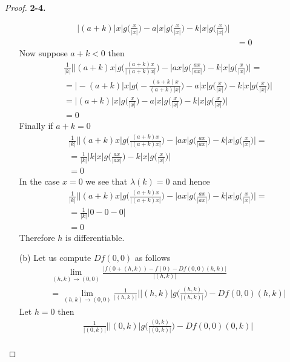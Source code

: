 \documentclass[11pt]{article}
\theoremstyle{definition}
\begin{document}
\begin{proof}{\textbf{2-4.}}
\begin{itemize}
\begin{align*}
    \bigg|(a + k)|x|g\bigg(\frac{x}{|x|}\bigg)
    - a|x|g\bigg(\frac{x}{|x|}\bigg)
    - k|x|g\bigg(\frac{x}{|x|}\bigg)
    \bigg|\\
    &= 0
\end{align*}
Now suppose $a + k < 0$ then
\begin{align*}
    &\frac{1}{|k|}
    \bigg||(a + k)x|g\bigg(\frac{(a + k)x}{|(a + k)x|}\bigg)
    - |ax|g\bigg(\frac{ax}{|ax|}\bigg)
    - k|x|g\bigg(\frac{x}{|x|}\bigg)
    \bigg| = \\
    &= \bigg|-(a + k)|x|g\bigg(-\frac{(a + k)x}{(a + k)|x|}\bigg)
    - a|x|g\bigg(\frac{x}{|x|}\bigg)
    - k|x|g\bigg(\frac{x}{|x|}\bigg)
    \bigg|\\
    &= \bigg|(a + k)|x|g\bigg(\frac{x}{|x|}\bigg)
    - a|x|g\bigg(\frac{x}{|x|}\bigg)
    - k|x|g\bigg(\frac{x}{|x|}\bigg)
    \bigg|\\
    &= 0
\end{align*}
Finally if $a + k = 0$
\begin{align*}
    &\frac{1}{|k|}
    \bigg||(a + k)x|g\bigg(\frac{(a + k)x}{|(a + k)x|}\bigg)
    - |ax|g\bigg(\frac{ax}{|ax|}\bigg)
    - k|x|g\bigg(\frac{x}{|x|}\bigg)
    \bigg| = \\
    &=\frac{1}{|k|}
    \bigg| k|x|g\bigg(\frac{ax}{|ax|}\bigg)
    - k|x|g\bigg(\frac{x}{|x|}\bigg)
    \bigg|\\
    &= 0
\end{align*}
In the case $x = 0$ we see that $\lambda(k) = 0$ and hence
\begin{align*}
    &\frac{1}{|k|}
    \bigg||(a + k)x|g\bigg(\frac{(a + k)x}{|(a + k)x|}\bigg)
    - |ax|g\bigg(\frac{ax}{|ax|}\bigg)
    - k|x|g\bigg(\frac{x}{|x|}\bigg)
    \bigg| = \\
    &=\frac{1}{|k|} \bigg| 0 - 0 - 0 \bigg|\\
    &= 0
\end{align*}
Therefore $h$ is differentiable.
\item [(b)] Let us compute $Df(0,0)$ as follows
\begin{align*}
    &\lim_{(h,k) \to (0,0)} \frac{|f(0 + (h,k)) - f(0) - Df(0,0)(h,k)|}{|(h,k)|}\\
    &= \lim_{(h,k) \to (0,0)}
    \frac{1}{|(h,k)|}\bigg|
    |(h,k)|g\bigg(\frac{(h,k)}{|(h,k)|}\bigg)  - Df(0,0)(h,k)\bigg|
\end{align*}
Let $h = 0$ then
\begin{align*}
    &\frac{1}{|(0,k)|}\bigg|
    |(0,k)|g\bigg(\frac{(0,k)}{|(0,k)|}\bigg)  - Df(0,0)(0,k)\bigg|\\

\end{align*}
\end{itemize}
\end{proof}
\end{document}
